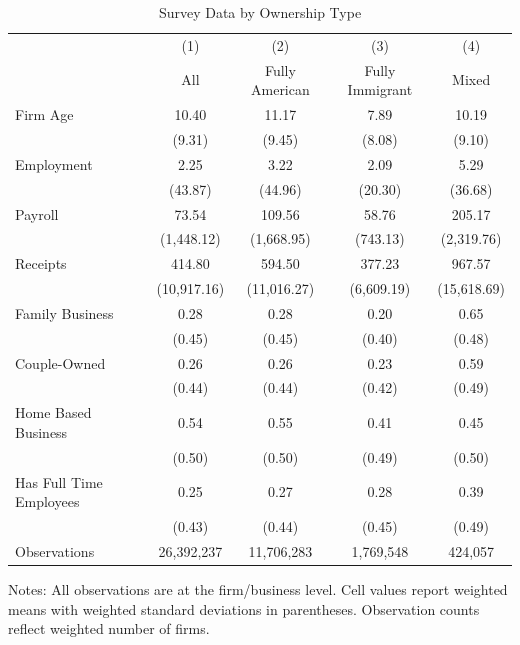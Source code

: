 \begin{table}[htbp]\centering\caption{Survey Data by Ownership Type \label{tab:sbo}}\begin{tabular}{l*{4}{c}}\toprule & (1) & (2) & (3) & (4) \\
& All & Fully American & Fully Immigrant & Mixed \\ \midrule \midrule
Firm Age            &       10.40&       11.17&        7.89&       10.19\\
                    &      (9.31)&      (9.45)&      (8.08)&      (9.10)\\
Employment          &        2.25&        3.22&        2.09&        5.29\\
                    &     (43.87)&     (44.96)&     (20.30)&     (36.68)\\
Payroll             &       73.54&      109.56&       58.76&      205.17\\
                    &  (1,448.12)&  (1,668.95)&    (743.13)&  (2,319.76)\\
Receipts            &      414.80&      594.50&      377.23&      967.57\\
                    & (10,917.16)& (11,016.27)&  (6,609.19)& (15,618.69)\\
Family Business     &        0.28&        0.28&        0.20&        0.65\\
                    &      (0.45)&      (0.45)&      (0.40)&      (0.48)\\
Couple-Owned        &        0.26&        0.26&        0.23&        0.59\\
                    &      (0.44)&      (0.44)&      (0.42)&      (0.49)\\
Home Based Business &        0.54&        0.55&        0.41&        0.45\\
                    &      (0.50)&      (0.50)&      (0.49)&      (0.50)\\
Has Full Time Employees&        0.25&        0.27&        0.28&        0.39\\
                    &      (0.43)&      (0.44)&      (0.45)&      (0.49)\\
\midrule
Observations &   26,392,237 &   11,706,283 &    1,769,548 &      424,057 \\\bottomrule\end{tabular}\par\smallskip\raggedright\footnotesize Notes: All observations are at the firm/business level. Cell values report weighted means with weighted standard deviations in parentheses. Observation counts reflect weighted number of firms.\end{table}
